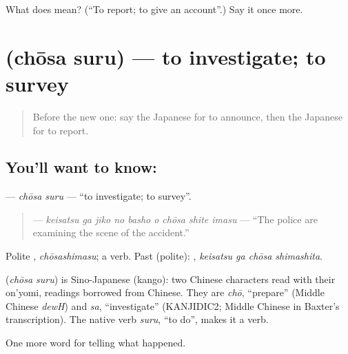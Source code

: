 \begin{tcolorbox}[breakable,colback=teal!4,colframe=teal!35!black,title={Before you move on}]
What does  mean? (\textquotedblleft{}To report; to give an account\textquotedblright{}.) Say it once more.
\end{tcolorbox}
\section[\texorpdfstring{\ja{ちょうさする} (chōsa suru)}{ちょうさする (chōsa suru)}]{ (chōsa suru) — to investigate; to survey}

\label{lesson:JA-C283-chousa-suru}



\begin{quote}
Before the new one: say the Japanese for to announce, then the Japanese for to report.
\end{quote}

\subsection*{You'll want to know: }
\textbf{} — \emph{chōsa suru} — \textquotedblleft{}to investigate; to survey\textquotedblright{}.

\begin{quote}
\textbf{   } — \emph{keisatsu ga jiko no basho o chōsa shite imasu} — \textquotedblleft{}The police are examining the scene of the accident.\textquotedblright{}
\end{quote}

Polite \textbf{}, \emph{chōsashimasu}; a  verb. Past (polite): \textbf{ }, \emph{keisatsu ga chōsa shimashita}.

\begin{cousinweb}
\textbf{} (\emph{chōsa suru}) is Sino-Japanese (kango): two Chinese characters read with their on'yomi, readings borrowed from Chinese. They are \emph{chō}, \textquotedblleft{}prepare\textquotedblright{} (Middle Chinese \emph{dewH}) and \emph{sa}, \textquotedblleft{}investigate\textquotedblright{} (KANJIDIC2; Middle Chinese in Baxter's transcription). The native verb \emph{suru}, \textquotedblleft{}to do\textquotedblright{}, makes it a verb.
\end{cousinweb}

\begin{grammarlens}[title={What you've built}]
One more word for telling what happened.
\end{grammarlens}

